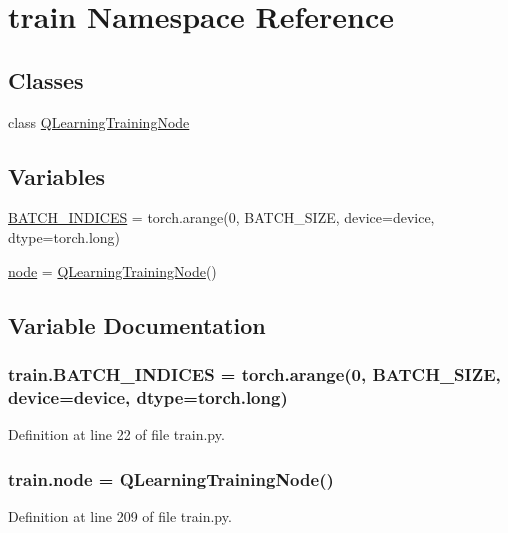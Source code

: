 \hypertarget{namespacetrain}{}\section{train Namespace Reference}
\label{namespacetrain}
\subsection*{Classes}
\begin{DoxyCompactItemize}
\item 
class \hyperlink{classtrain_1_1_q_learning_training_node}{Q\+Learning\+Training\+Node}
\end{DoxyCompactItemize}
\subsection*{Variables}
\begin{DoxyCompactItemize}
\item 
\hyperlink{namespacetrain_ab5b44727ca7567b7191d18956f4c4e64}{B\+A\+T\+C\+H\+\_\+\+I\+N\+D\+I\+C\+ES} = torch.\+arange(0, B\+A\+T\+C\+H\+\_\+\+S\+I\+ZE, device=device, dtype=torch.\+long)
\item 
\hyperlink{namespacetrain_a7c68a6981d3c74c76920e856fc7c2419}{node} = \hyperlink{classtrain_1_1_q_learning_training_node}{Q\+Learning\+Training\+Node}()
\end{DoxyCompactItemize}


\subsection{Variable Documentation}
\subsubsection[{\texorpdfstring{B\+A\+T\+C\+H\+\_\+\+I\+N\+D\+I\+C\+ES}{BATCH_INDICES}}]{\setlength{\rightskip}{0pt plus 5cm}train.\+B\+A\+T\+C\+H\+\_\+\+I\+N\+D\+I\+C\+ES = torch.\+arange(0, B\+A\+T\+C\+H\+\_\+\+S\+I\+ZE, device=device, dtype=torch.\+long)}\hypertarget{namespacetrain_ab5b44727ca7567b7191d18956f4c4e64}{}\label{namespacetrain_ab5b44727ca7567b7191d18956f4c4e64}


Definition at line 22 of file train.\+py.

\subsubsection[{\texorpdfstring{node}{node}}]{\setlength{\rightskip}{0pt plus 5cm}train.\+node = {\bf Q\+Learning\+Training\+Node}()}\hypertarget{namespacetrain_a7c68a6981d3c74c76920e856fc7c2419}{}\label{namespacetrain_a7c68a6981d3c74c76920e856fc7c2419}


Definition at line 209 of file train.\+py.

